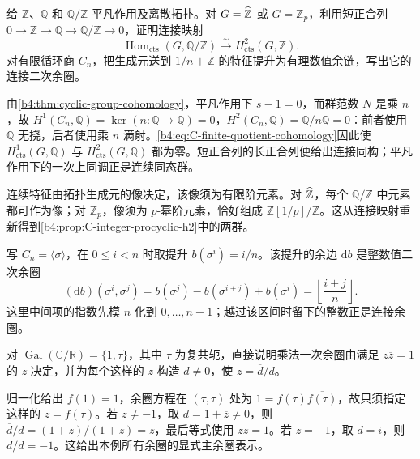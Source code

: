 \begin{exercise}\label{b4:ex:C-nontorsion-h2}
	给 \(\mathbb Z\)、\(\mathbb Q\) 和 \(\mathbb Q/\mathbb Z\) 平凡作用及离散拓扑。对 \(G=\widehat{\vphantom{Z}\mathbb Z}\) 或 \(G=\mathbb Z_p\)，利用短正合列 \(0\to\mathbb Z\to\mathbb Q\to\mathbb Q/\mathbb Z\to0\)，证明连接映射
	\[
		\operatorname{Hom}_{\mathrm{cts}}(G,\mathbb Q/\mathbb Z) \xrightarrow{\sim}H^2_{\mathrm{cts}}(G,\mathbb Z).
	\]
	对有限循环商 \(C_n\)，把生成元送到 \(1/n+\mathbb Z\) 的特征提升为有理数值余链，写出它的连接二次余圈。
\end{exercise}
\begin{solution}
	由\cref{b4:thm:cyclic-group-cohomology}，平凡作用下 \(s-1=0\)，而群范数 \(N\) 是乘 \(n\)，故 \(H^1(C_n,\mathbb Q)=\ker(n:\mathbb Q\to\mathbb Q)=0\)，\(H^2(C_n,\mathbb Q)=\mathbb Q/n\mathbb Q=0\)：前者使用 \(\mathbb Q\) 无挠，后者使用乘 \(n\) 满射。\eqref{b4:eq:C-finite-quotient-cohomology}因此使 \(H^1_{\mathrm{cts}}(G,\mathbb Q)\) 与 \(H^2_{\mathrm{cts}}(G,\mathbb Q)\) 都为零。短正合列的长正合列便给出连接同构；平凡作用下的一次上同调正是连续同态群。

	连续特征由拓扑生成元的像决定，该像须为有限阶元素。对 \(\widehat{\vphantom{Z}\mathbb Z}\)，每个 \(\mathbb Q/\mathbb Z\) 中元素都可作为像；对 \(\mathbb Z_p\)，像须为 \(p\)-幂阶元素，恰好组成 \(\mathbb Z[1/p]/\mathbb Z\)。这从连接映射重新得到\cref{b4:prop:C-integer-procyclic-h2}中的两群。

	写 \(C_n=\langle\sigma\rangle\)，在 \(0\le i<n\) 时取提升 \(b(\sigma^i)=i/n\)。该提升的余边 \(\mathrm db\) 是整数值二次余圈
	\[
		(\mathrm db)(\sigma^i,\sigma^j) =b(\sigma^j)-b(\sigma^{i+j})+b(\sigma^i) =\left\lfloor\frac{i+j}{n}\right\rfloor.
	\]
	这里中间项的指数先模 \(n\) 化到 \(0,\ldots,n-1\)；越过该区间时留下的整数正是连接余圈。
\end{solution}

\begin{exercise}\label{b4:ex:C-hilbert90-complex}
	对 \(\operatorname{Gal}(\mathbb C/\mathbb R)=\{1,\tau\}\)，其中 \(\tau\) 为复共轭，直接说明乘法一次余圈由满足 \(z\overline z=1\) 的 \(z\) 决定，并为每个这样的 \(z\) 构造 \(d\ne0\)，使 \(z=\overline d/d\)。
\end{exercise}
\begin{solution}
	归一化给出 \(f(1)=1\)，余圈方程在 \((\tau,\tau)\) 处为 \(1=f(\tau)\overline{f(\tau)}\)，故只须指定这样的 \(z=f(\tau)\)。若 \(z\ne-1\)，取 \(d=1+\overline z\ne0\)，则 \(\overline d/d=(1+z)/(1+\overline z)=z\)，最后等式使用 \(z\overline z=1\)。若 \(z=-1\)，取 \(d=i\)，则 \(\overline d/d=-1\)。这给出本例所有余圈的显式主余圈表示。
\end{solution}

